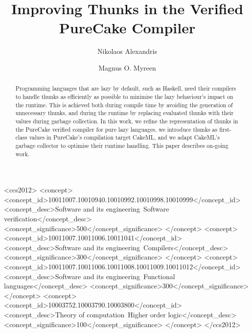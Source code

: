 \documentclass[sigconf]{acmart}
\begin{document}
\title{Improving Thunks in the Verified PureCake Compiler}

\author{Nikolaos Alexandris}

\author{Magnus O. Myreen}

\begin{abstract}
Programming languages that are lazy by default, such as Haskell, need their
compilers to handle thunks as efficiently as possible to minimise the lazy
behaviour's impact on the runtime. This is achieved both during compile time
by avoiding the generation of unnecessary thunks, and during the runtime by
replacing evaluated thunks with their values during garbage collection. In
this work, we refine the representation of thunks in the PureCake verified
compiler for pure lazy languages, we introduce thunks as first-class values in
PureCake's compilation target CakeML, and we adapt CakeML's garbage collector
to optimise their runtime handling. This paper describes on-going work.
\end{abstract}

\begin{CCSXML}
<ccs2012>
   <concept>
       <concept_id>10011007.10010940.10010992.10010998.10010999</concept_id>
       <concept_desc>Software and its engineering~Software verification</concept_desc>
       <concept_significance>500</concept_significance>
       </concept>
   <concept>
       <concept_id>10011007.10011006.10011041</concept_id>
       <concept_desc>Software and its engineering~Compilers</concept_desc>
       <concept_significance>300</concept_significance>
       </concept>
   <concept>
       <concept_id>10011007.10011006.10011008.10011009.10011012</concept_id>
       <concept_desc>Software and its engineering~Functional languages</concept_desc>
       <concept_significance>300</concept_significance>
       </concept>
   <concept>
       <concept_id>10003752.10003790.10003800</concept_id>
       <concept_desc>Theory of computation~Higher order logic</concept_desc>
       <concept_significance>100</concept_significance>
       </concept>
 </ccs2012>
\end{CCSXML}
\end{document}
